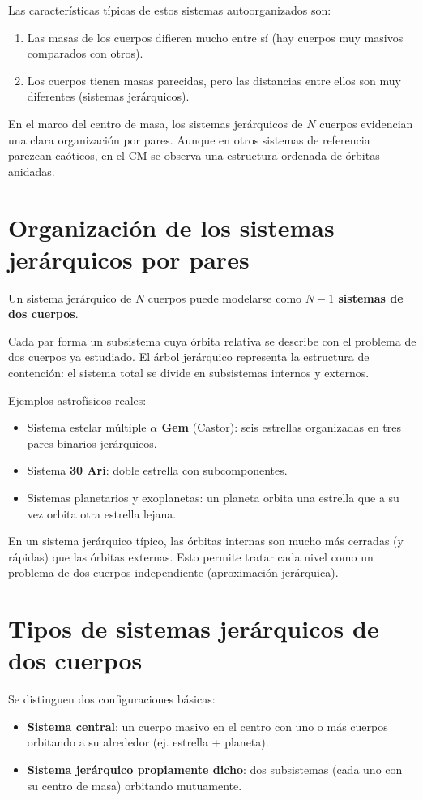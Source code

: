 \documentclass[12pt,oneside]{book}
\begin{document}
Las características típicas de estos sistemas autoorganizados son:
\begin{enumerate}
    \item Las masas de los cuerpos difieren mucho entre sí (hay cuerpos muy masivos comparados con otros).
    \item Los cuerpos tienen masas parecidas, pero las distancias entre ellos son muy diferentes (sistemas jerárquicos).
\end{enumerate}

\begin{importante}
En el marco del centro de masa, los sistemas jerárquicos de \(N\) cuerpos evidencian una clara organización por pares. Aunque en otros sistemas de referencia parezcan caóticos, en el CM se observa una estructura ordenada de órbitas anidadas.
\end{importante}

\section{Organización de los sistemas jerárquicos por pares}
Un sistema jerárquico de \(N\) cuerpos puede modelarse como \textbf{\(N-1\) sistemas de dos cuerpos}.

Cada par forma un subsistema cuya órbita relativa se describe con el problema de dos cuerpos ya estudiado. El árbol jerárquico representa la estructura de contención: el sistema total se divide en subsistemas internos y externos.

Ejemplos astrofísicos reales:
\begin{itemize}
    \item Sistema estelar múltiple \textbf{$\alpha$ Gem} (Castor): seis estrellas organizadas en tres pares binarios jerárquicos.
    \item Sistema \textbf{30 Ari}: doble estrella con subcomponentes.
    \item Sistemas planetarios y exoplanetas: un planeta orbita una estrella que a su vez orbita otra estrella lejana.
\end{itemize}

\begin{importante}
En un sistema jerárquico típico, las órbitas internas son mucho más cerradas (y rápidas) que las órbitas externas. Esto permite tratar cada nivel como un problema de dos cuerpos independiente (aproximación jerárquica).
\end{importante}

\section{Tipos de sistemas jerárquicos de dos cuerpos}
Se distinguen dos configuraciones básicas:
\begin{itemize}
    \item \textbf{Sistema central}: un cuerpo masivo en el centro con uno o más cuerpos orbitando a su alrededor (ej. estrella + planeta).
    \item \textbf{Sistema jerárquico propiamente dicho}: dos subsistemas (cada uno con su centro de masa) orbitando mutuamente.
\end{itemize}
\end{document}
